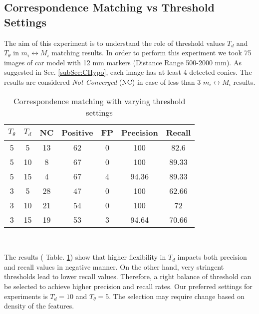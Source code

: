 \documentclass{bmvc2k}
\begin{document}
\subsection{Correspondence Matching vs Threshold Settings}
The aim of this experiment is to understand the role of threshold values $ T_{d}$ and $ T_\theta $ in $ m_i \leftrightarrow M_i $ matching results. 
In order to perform this experiment we took 75 images of car model with 12 mm markers (Distance Range 500-2000 mm). 
As suggested in Sec. \ref{subSec:CHypo}, each image has at least 4 detected conics. 
The results are considered \textit{Not Converged} (NC) in case of less than 3 $ m_i \leftrightarrow M_i $ results.

\begin{table}[h]
\centering
\caption{Correspondence matching with varying threshold settings } \label{table:ThresholdEffect}
\begin{tabular}{ | c | c | c | c | c | c| c |}
\hline
$ T_\theta $ & $ T_{d} $ & NC & Positive & FP & Precision & Recall \\ \hline
5 & 5  & 13 & 62 & 0 & 100 & 82.6 \\
5 & 10 & 8 & 67 & 0 & 100 & 89.33\\
5 & 15 & 4 & 67  & 4 & 94.36 & 89.33\\ \hline
3 & 5  & 28 & 47  & 0 & 100 & 62.66 \\
3 & 10 & 21 & 54  & 0 & 100 & 72 \\
3 & 15 & 19 & 53  & 3 & 94.64 & 70.66 \\ \hline
\end{tabular} \\
\label{tab:Exp2}
\end{table}

The results ( Table. \ref{tab:Exp2}) show that higher flexibility in $ T_{d} $ impacts both precision and recall values in negative manner. 
On the other hand, very stringent thresholds lead to lower recall values. Therefore, a right balance of threshold can be selected to achieve higher precision and recall rates. Our preferred settings for experiments is $ T_{d} = 10 $ and $ T_\theta = 5 $. The selection may require change based on density of the features. 
\end{document}
